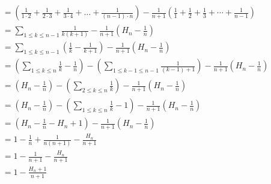 \begin{align*}
      & = \left(\frac{1}{1\cdot 2}+ \frac{1}{2\cdot 3}+ \frac{1}{3\cdot 4} + \ldots + \frac{1}{(n-1)\cdot n}\right) - \frac{1}{n+1}\left(\frac{1}{1} + \frac{1}{2} + \frac{1}{3} + \cdots + \frac{1}{n-1}\right)                                                                                                          \\
      & =\sum_{1 \leq k \leq n-1} \frac{1}{k(k+1)}  - \frac{1}{n+1} \left(H_n-\frac{1}{n}\right)                                                                                                                                                                                                                          \\
      & =\sum_{1 \leq k \leq n-1} \left(\frac{1}{k}-\frac{1}{k+1}\right)  - \frac{1}{n+1} \left(H_n-\frac{1}{n}\right)                                                                                                                                                                                                    \\
      & =\left(\sum_{1 \leq k \leq n}\frac{1}{k} - \frac{1}{n}\right) - \left(\sum_{1 \leq k-1 \leq n-1}\frac{1}{(k-1)+1}\right) - \frac{1}{n+1} \left(H_n-\frac{1}{n}\right)                                                                                                                                             \\
      & =\left(H_n - \frac{1}{n}\right) - \left(\sum_{2 \leq k \leq n}\frac{1}{k}\right)- \frac{1}{n+1} \left(H_n-\frac{1}{n}\right)                                                                                                                                                                                      \\
      & =\left(H_n - \frac{1}{n}\right) - \left(\sum_{1 \leq k \leq n}\frac{1}{k}-1\right)- \frac{1}{n+1} \left(H_n-\frac{1}{n}\right)                                                                                                                                                                                    \\
      & =\left(H_n - \frac{1}{n} -H_n + 1\right)- \frac{1}{n+1} \left(H_n-\frac{1}{n}\right)                                                                                                                                                                                                                              \\
      & =1-\frac{1}{n}+\frac{1}{n(n+1)}-\frac{H_n}{n+1}                                                                                                                                                                                                                                                                   \\
      & =1-\frac{1}{n+1}-\frac{H_n}{n+1}                                                                                                                                                                                                                                                                                  \\
      & =1-\frac{H_n+1}{n+1}
\end{align*}
